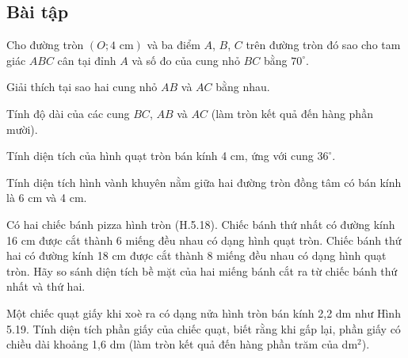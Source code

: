 \begin{exercises}
    \subsection{Bài tập}

    \begin{questions}[resume=SGK]
        \item Cho đường tròn $(O;4\text{ cm})$ và ba điểm $A$, $B$, $C$ trên đường tròn đó sao cho tam giác $ABC$ cân tại đỉnh $A$ và số đo của cung nhỏ $BC$ bằng $70^\circ$.
        \begin{questions}
            \item Giải thích tại sao hai cung nhỏ $AB$ và $AC$ bằng nhau.

            \answerline
            \answerline

            \item Tính độ dài của các cung $BC$, $AB$ và $AC$ (làm tròn kết quả đến hàng phần mười).

            \answerline
            \answerline
            \answerline
        \end{questions}

        \item Tính diện tích của hình quạt tròn bán kính 4 cm, ứng với cung $36^\circ$.

        \answerline
        \answerline

        \item Tính diện tích hình vành khuyên nằm giữa hai đường tròn đồng tâm có bán kính là 6 cm và 4 cm.

        \answerline
        \answerline

        \item Có hai chiếc bánh pizza hình tròn (H.5.18). Chiếc bánh thứ nhất có đường kính 16 cm được cắt thành 6 miếng đều nhau có dạng hình quạt tròn. Chiếc bánh thứ hai có đường kính 18 cm được cắt thành 8 miếng đều nhau có dạng hình quạt tròn. Hãy so sánh diện tích bề mặt của hai miếng bánh cắt ra từ chiếc bánh thứ nhất và thứ hai.


        \answerline
        \answerline
        \answerline

        \item Một chiếc quạt giấy khi xoè ra có dạng nửa hình tròn bán kính 2,2 dm như Hình 5.19. Tính diện tích phần giấy của chiếc quạt, biết rằng khi gấp lại, phần giấy có chiều dài khoảng 1,6 dm (làm tròn kết quả đến hàng phần trăm của dm$^2$).


        \answerline
        \answerline
        \answerline
    \end{questions}
\end{exercises}

